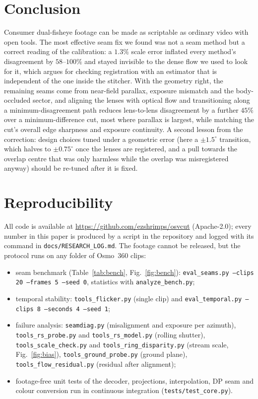 \documentclass[11pt]{article}
\begin{document}
\section{Conclusion}

Consumer dual-fisheye footage can be made as scriptable as ordinary video with open tools. The most effective seam fix we found was not a seam method but a correct reading of the calibration: a $1.3\%$ scale error inflated every method's disagreement by $58$--$100\%$ and stayed invisible to the dense flow we used to look for it, which argues for checking registration with an estimator that is independent of the one inside the stitcher. With the geometry right, the remaining seams come from near-field parallax, exposure mismatch and the body-occluded sector, and aligning the lenses with optical flow and transitioning along a minimum-disagreement path reduces lens-to-lens disagreement by a further $45\%$ over a minimum-difference cut, most where parallax is largest, while matching the cut's overall edge sharpness and exposure continuity. A second lesson from the correction: design choices tuned under a geometric error (here a $\pm1.5^\circ$ transition, which halves to $\pm0.75^\circ$ once the lenses are registered, and a pull towards the overlap centre that was only harmless while the overlap was misregistered anyway) should be re-tuned after it is fixed.

\section*{Reproducibility}
All code is available at \url{https://github.com/ezshrimps/osvcut} (Apache-2.0); every number in this paper is produced by a script in the repository and logged with its command in \texttt{docs/RESEARCH\_LOG.md}. The footage cannot be released, but the protocol runs on any folder of Osmo~360 clips:
\begin{itemize}\itemsep0pt\raggedright
\item seam benchmark (Table~\ref{tab:bench}, Fig.~\ref{fig:bench}): \texttt{eval\_seams.py --clips 20 --frames 5 --seed 0}, statistics with \texttt{analyze\_bench.py};
\item temporal stability: \texttt{tools\_flicker.py} (single clip) and \texttt{eval\_temporal.py --clips 8 --seconds 4 --seed 1};
\item failure analysis: \texttt{seamdiag.py} (misalignment and exposure per azimuth), \texttt{tools\_rs\_probe.py} and \texttt{tools\_rs\_model.py} (rolling shutter), \texttt{tools\_scale\_check.py} and \texttt{tools\_ring\_disparity.py} (stream scale, Fig.~\ref{fig:bias}), \texttt{tools\_ground\_probe.py} (ground plane), \texttt{tools\_flow\_residual.py} (residual after alignment);
\item footage-free unit tests of the decoder, projections, interpolation, DP seam and colour conversion run in continuous integration (\texttt{tests/test\_core.py}).
\end{itemize}



\end{document}
